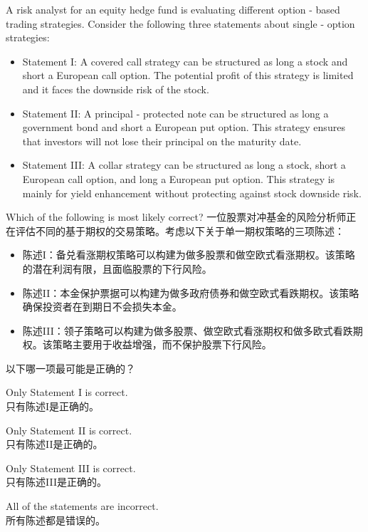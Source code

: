 \documentclass{article}
\newcounter{question} %
\begin{document}
    \begin{question}
        A risk analyst for an equity hedge fund is evaluating different option - based trading strategies. Consider the following three statements about single - option strategies:
        \begin{itemize}
        \item Statement I: A covered call strategy can be structured as long a stock and short a European call option. The potential profit of this strategy is limited and it faces the downside risk of the stock. 
        \item Statement II: A principal - protected note can be structured as long a government bond and short a European put option. This strategy ensures that investors will not lose their principal on the maturity date. 
        \item Statement III: A collar strategy can be structured as long a stock, short a European call option, and long a European put option. This strategy is mainly for yield enhancement without protecting against stock downside risk.
        \end{itemize}
        Which of the following is most likely correct?
        一位股票对冲基金的风险分析师正在评估不同的基于期权的交易策略。考虑以下关于单一期权策略的三项陈述：
        \begin{itemize}
        \item 陈述I：备兑看涨期权策略可以构建为做多股票和做空欧式看涨期权。该策略的潜在利润有限，且面临股票的下行风险。
        \item 陈述II：本金保护票据可以构建为做多政府债券和做空欧式看跌期权。该策略确保投资者在到期日不会损失本金。
        \item 陈述III：领子策略可以构建为做多股票、做空欧式看涨期权和做多欧式看跌期权。该策略主要用于收益增强，而不保护股票下行风险。
        \end{itemize}
        以下哪一项最可能是正确的？
        \end{question}
        
        \begin{choices}
            \item Only Statement I is correct.\\
            只有陈述I是正确的。
            \item Only Statement II is correct.\\
            只有陈述II是正确的。
            \item Only Statement III is correct.\\
            只有陈述III是正确的。
            \item All of the statements are incorrect.\\
            所有陈述都是错误的。
        \end{choices}
        
\end{document}
